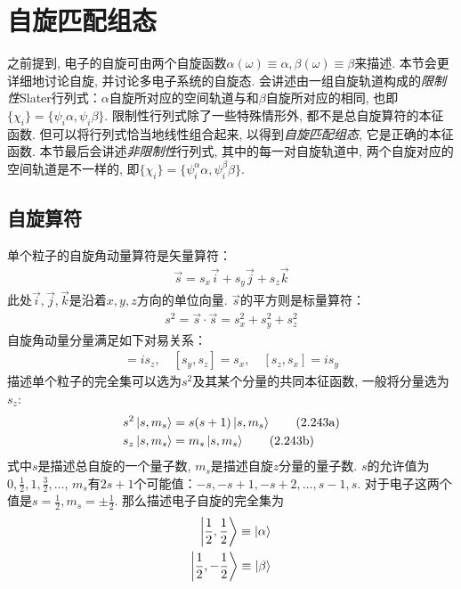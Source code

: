 \section{自旋匹配组态}
\label{sec2.5}
之前提到, 
电子的自旋可由两个自旋函数$\alpha(\omega) \equiv \alpha, \beta(\omega) \equiv \beta$来描述. 
本节会更详细地讨论自旋, 
并讨论多电子系统的自旋态. 
会讲述由一组自旋轨道构成的\emph{限制性}Slater行列式：$\alpha$自旋所对应的空间轨道与和$\beta$自旋所对应的相同, 
也即$\{\chi_i\} = \{\psi_i\alpha,\psi_i\beta\}$. 
限制性行列式除了一些特殊情形外, 
都不是总自旋算符的本征函数. 
但可以将行列式恰当地线性组合起来, 
以得到\emph{自旋匹配组态}, 
它是正确的本征函数. 
本节最后会讲述\emph{非限制性}行列式, 
其中的每一对自旋轨道中, 
两个自旋对应的空间轨道是不一样的, 
即$\{\chi_i\} = \{\psi_i^\alpha\alpha,\psi_i^\beta\beta\}$.

\subsection{自旋算符}
\label{sec2.5.1}
单个粒子的自旋角动量算符是矢量算符：
\begin{align}
\vec{s} = s_x\vec{i} + s_y\vec{j} + s_z\vec{k}
\end{align}
此处$\vec{i},\vec{j},\vec{k}$是沿着$x,y,z$方向的单位向量. 
$\vec{s}$的平方则是标量算符：
\begin{align}
s^2 = \vec{s}\cdot\vec{s} = s^2_x + s^2_y + s^2_z
\end{align}
自旋角动量分量满足如下对易关系：
\begin{align}
[s_x,s_y] = is_z,\quad [s_y,s_z] = s_x,\quad [s_z,s_x]=is_y
\end{align}
描述单个粒子的完全集可以选为$s^2$及其某个分量的共同本征函数, 
一般将分量选为$s_z$:
\begin{subequations}
	\begin{align}
	s^2\Ket{s,m_s} & = s(s+1)\Ket{s,m_s}\tag{2.243a}\\
	s_z\Ket{s,m_s} & = m_s\Ket{s,m_s}\tag{2.243b}
	\end{align}
\end{subequations}
式中$s$是描述总自旋的一个量子数, 
$m_s$是描述自旋$z$分量的量子数. 
$s$的允许值为$0,\frac{1}{2},1,\frac{3}{2},\ldots$, 
$m_s$有$2s+1$个可能值：$-s,-s+1,-s+2,\ldots,s-1,s$. 
对于电子这两个值是$s=\frac{1}{2},m_s=\pm\frac{1}{2}$. 
那么描述电子自旋的完全集为
\begin{subequations}
	\begin{align}
	\Ket{\frac{1}{2},\frac{1}{2}} \equiv \Ket{\alpha}\\
	\Ket{\frac{1}{2},-\frac{1}{2}} \equiv \Ket{\beta}
	\end{align}
\end{subequations}
